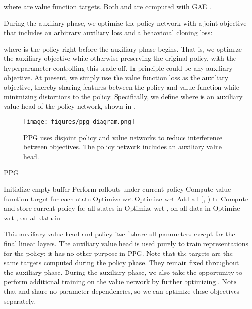 \documentclass{article}
\begin{document}
where  are value function targets. Both  and  are computed with GAE \citep{gae}.

During the auxiliary phase, we optimize the policy network with a joint objective that includes an arbitrary auxiliary loss and a behavioral cloning loss:


where  is the policy right before the auxiliary phase begins. That is, we optimize the auxiliary objective while otherwise preserving the original policy, with the hyperparameter  controlling this trade-off. In principle  could be any auxiliary objective. At present, we simply use the value function loss as the auxiliary objective, thereby sharing features between the policy and value function while minimizing distortions to the policy. Specifically, we define  where  is an auxiliary value head of the policy network, shown in .

\begin{figure*}
\centering
\texttt{[image: figures/ppg\_diagram.png]}
\caption{PPG uses disjoint policy and value networks to reduce interference between objectives. The policy network includes an auxiliary value head.}
\label{fig:ppg_arch}
\end{figure*}

\begin{algorithm}
\caption{PPG}
\begin{algorithmic}
  \State Initialize empty buffer 
    \State Perform rollouts under current policy 
    \State Compute value function target  for each state 
        \State Optimize  wrt 
    \EndFor
        \State Optimize  wrt 
    \EndFor
    \State Add all (, ) to 
  \EndFor
  \State Compute and store current policy  for all states  in 
    \State Optimize  wrt , on all data in 
    \State Optimize  wrt , on all data in 
  \EndFor
\EndFor
\end{algorithmic}
\end{algorithm}

This auxiliary value head and policy itself share all parameters except for the final linear layers. The auxiliary value head is used purely to train representations for the policy; it has no other purpose in PPG. Note that the targets  are the same targets computed during the policy phase. They remain fixed throughout the auxiliary phase. During the auxiliary phase, we also take the opportunity to perform additional training on the value network by further optimizing . Note that  and  share no parameter dependencies, so we can optimize these objectives separately. 
\end{document}
